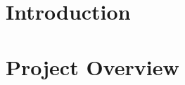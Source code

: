 \documentclass[12pt,twoside]{article}
\date{September 2018}
\begin{document}






\clearpage{\pagestyle{empty}\cleardoublepage}

\begin{abstract}



\end{abstract}
\clearpage


\renewcommand{\abstractname}{Acknowledgements}
\begin{abstract}



\end{abstract}
\clearpage


\tableofcontents 

\clearpage{\pagestyle{empty}\cleardoublepage}
\setcounter{page}{1}
\fancyhead[LE,RO]{\slshape \rightmark}
\fancyhead[LO,RE]{\slshape \leftmark}


\section{Introduction}



\clearpage



\section{Project Overview}
\end{document}

